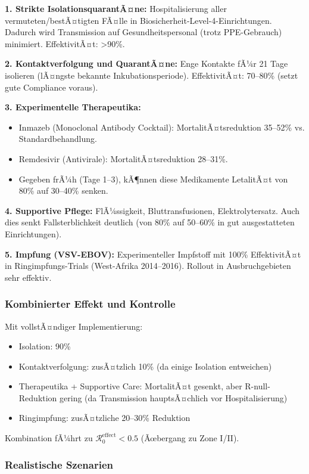 ﻿\documentclass[a4paper,12pt,twoside]{article}
\theoremstyle{definition}
\begin{document}
\textbf{1. Strikte IsolationsquarantÃ¤ne:} Hospitalisierung aller vermuteten/bestÃ¤tigten FÃ¤lle in Biosicherheit-Level-4-Einrichtungen. Dadurch wird Transmission auf Gesundheitspersonal (trotz PPE-Gebrauch) minimiert. EffektivitÃ¤t: >90\%.

\textbf{2. Kontaktverfolgung und QuarantÃ¤ne:} Enge Kontakte fÃ¼r 21 Tage isolieren (lÃ¤ngste bekannte Inkubationsperiode). EffektivitÃ¤t: 70--80\% (setzt gute Compliance voraus).

\textbf{3. Experimentelle Therapeutika:} 
\begin{itemize}
\item Inmazeb (Monoclonal Antibody Cocktail): MortalitÃ¤tsreduktion 35--52\% vs. Standardbehandlung.
\item Remdesivir (Antivirale): MortalitÃ¤tsreduktion 28--31\%.
\item Gegeben frÃ¼h (Tage 1--3), kÃ¶nnen diese Medikamente LetalitÃ¤t von 80\% auf 30--40\% senken.
\end{itemize}

\textbf{4. Supportive Pflege:} FlÃ¼ssigkeit, Bluttransfusionen, Elektrolytersatz. Auch dies senkt Fallsterblichkeit deutlich (von 80\% auf 50--60\% in gut ausgestatteten Einrichtungen).

\textbf{5. Impfung (VSV-EBOV):} Experimenteller Impfstoff mit 100\% EffektivitÃ¤t in Ringimpfungs-Trials (West-Afrika 2014--2016). Rollout in Ausbruchgebieten sehr effektiv.

\subsubsection{Kombinierter Effekt und Kontrolle}

Mit vollstÃ¤ndiger Implementierung:
\begin{itemize}
\item Isolation: 90\%
\item Kontaktverfolgung: zusÃ¤tzlich 10\% (da einige Isolation entweichen)
\item Therapeutika + Supportive Care: MortalitÃ¤t gesenkt, aber R-null-Reduktion gering (da Transmission hauptsÃ¤chlich vor Hospitalisierung)
\item Ringimpfung: zusÃ¤tzliche 20--30\% Reduktion
\end{itemize}

Kombination fÃ¼hrt zu $\mathcal{R}_0^{\text{effect}} < 0.5$ (Ãœbergang zu Zone I/II).

\subsubsection{Realistische Szenarien}
\end{document}

